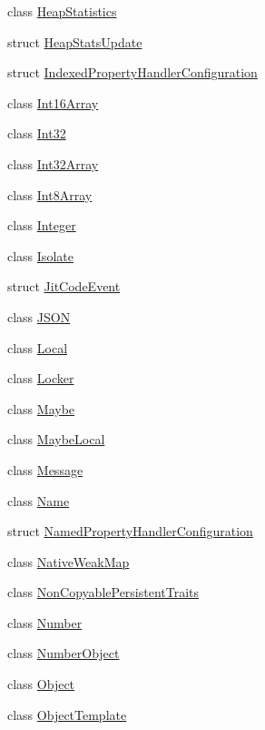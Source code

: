 \begin{DoxyCompactItemize}
\item 
class \hyperlink{classv8_1_1_heap_statistics}{Heap\+Statistics}
\item 
struct \hyperlink{structv8_1_1_heap_stats_update}{Heap\+Stats\+Update}
\item 
struct \hyperlink{structv8_1_1_indexed_property_handler_configuration}{Indexed\+Property\+Handler\+Configuration}
\item 
class \hyperlink{classv8_1_1_int16_array}{Int16\+Array}
\item 
class \hyperlink{classv8_1_1_int32}{Int32}
\item 
class \hyperlink{classv8_1_1_int32_array}{Int32\+Array}
\item 
class \hyperlink{classv8_1_1_int8_array}{Int8\+Array}
\item 
class \hyperlink{classv8_1_1_integer}{Integer}
\item 
class \hyperlink{classv8_1_1_isolate}{Isolate}
\item 
struct \hyperlink{structv8_1_1_jit_code_event}{Jit\+Code\+Event}
\item 
class \hyperlink{classv8_1_1_j_s_o_n}{J\+S\+O\+N}
\item 
class \hyperlink{classv8_1_1_local}{Local}
\item 
class \hyperlink{classv8_1_1_locker}{Locker}
\item 
class \hyperlink{classv8_1_1_maybe}{Maybe}
\item 
class \hyperlink{classv8_1_1_maybe_local}{Maybe\+Local}
\item 
class \hyperlink{classv8_1_1_message}{Message}
\item 
class \hyperlink{classv8_1_1_name}{Name}
\item 
struct \hyperlink{structv8_1_1_named_property_handler_configuration}{Named\+Property\+Handler\+Configuration}
\item 
class \hyperlink{classv8_1_1_native_weak_map}{Native\+Weak\+Map}
\item 
class \hyperlink{classv8_1_1_non_copyable_persistent_traits}{Non\+Copyable\+Persistent\+Traits}
\item 
class \hyperlink{classv8_1_1_number}{Number}
\item 
class \hyperlink{classv8_1_1_number_object}{Number\+Object}
\item 
class \hyperlink{classv8_1_1_object}{Object}
\item 
class \hyperlink{classv8_1_1_object_template}{Object\+Template}
\item 

\end{DoxyCompactItemize}
